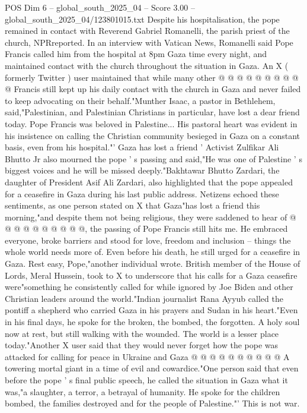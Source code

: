 \begin{textsample}{POS Dim 6 – global\_south\_2025\_04 – Score 3.00 – global\_south\_2025\_04/123801015.txt}
Despite his hospitalisation, the pope remained in contact with Reverend Gabriel Romanelli, the parish priest of the church, NPRreported.
In an interview with Vatican News, Romanelli said Pope Francis called him from the hospital at 8pm Gaza time every night, and maintained contact with the church throughout the situation in Gaza.
An X ( formerly Twitter ) user maintained that while many other @ @ @ @ @ @ @ @ @ @ Francis still kept up his daily contact with the church in Gaza and never failed to keep advocating on their behalf."Munther Isaac, a pastor in Bethlehem, said,"Palestinian, and Palestinian Christians in particular, have lost a dear friend today.
Pope Francis was beloved in Palestine...
His pastoral heart was evident in his insistence on calling the Christian community besieged in Gaza on a constant basis, even from his hospital."' Gaza has lost a friend ' Activist Zulfikar Ali Bhutto Jr also mourned the pope ' s passing and said,"He was one of Palestine ' s biggest voices and he will be missed deeply."Bakhtawar Bhutto Zardari, the daughter of President Asif Ali Zardari, also highlighted that the pope appealed for a ceasefire in Gaza during his last public address.
Netizens echoed these sentiments, as one person stated on X that Gaza"has lost a friend this morning,"and despite them not being religious, they were saddened to hear of @ @ @ @ @ @ @ @ @ @, the passing of Pope Francis still hits me.
He embraced everyone, broke barriers and stood for love, freedom and inclusion -- things the whole world needs more of.
Even before his death, he still urged for a ceasefire in Gaza.
Rest easy, Pope,"another individual wrote.
British member of the House of Lords, Meral Hussein, took to X to underscore that his calls for a Gaza ceasefire were"something he consistently called for while ignored by Joe Biden and other Christian leaders around the world."Indian journalist Rana Ayyub called the pontiff a shepherd who carried Gaza in his prayers and Sudan in his heart."Even in his final days, he spoke for the broken, the bombed, the forgotten.
A holy soul now at rest, but still walking with the wounded.
The world is a lesser place today."Another X user said that they would never forget how the pope was attacked for calling for peace in Ukraine and Gaza @ @ @ @ @ @ @ @ @ @ A towering mortal giant in a time of evil and cowardice."One person said that even before the pope ' s final public speech, he called the situation in Gaza what it was,"a slaughter, a terror, a betrayal of humanity.
He spoke for the children bombed, the families destroyed and for the people of Palestine."' This is not war.

\end{textsample}

